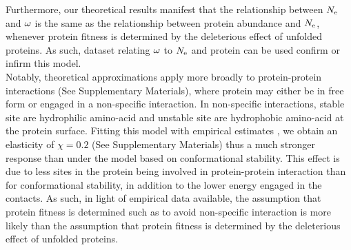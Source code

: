 \documentclass{article}
\begin{document}
	Furthermore, our theoretical results manifest that the relationship between $N_{\mathrm{e}}$ and $\omega$ is the same as the relationship between protein abundance and $N_{\mathrm{e}}$, whenever protein fitness is determined by the deleterious effect of unfolded proteins.
	As such, dataset relating $\omega$ to $N_{\mathrm{e}}$ and protein can be used confirm or infirm this model.\\
	
	Notably, theoretical approximations apply more broadly to protein-protein interactions (See Supplementary Materials), where protein may either be in free form or engaged in a non-specific interaction. 
	In non-specific interactions, stable site are hydrophilic amino-acid and unstable site are hydrophobic amino-acid at the protein surface.
	Fitting this model with empirical estimates \cite{Zhang2008}, we obtain an elasticity of $\chi = 0.2$ (See Supplementary Materials) thus a much stronger response than under the model based on conformational stability. 
	This effect is due to less sites in the protein being involved in protein-protein interaction than for conformational stability, in addition to the lower energy engaged in the contacts.
	As such, in light of empirical data available, the assumption that protein fitness is determined such as to avoid non-specific interaction is more likely than the assumption that protein fitness is determined by the deleterious effect of unfolded proteins. \\
	
	
\end{document}
